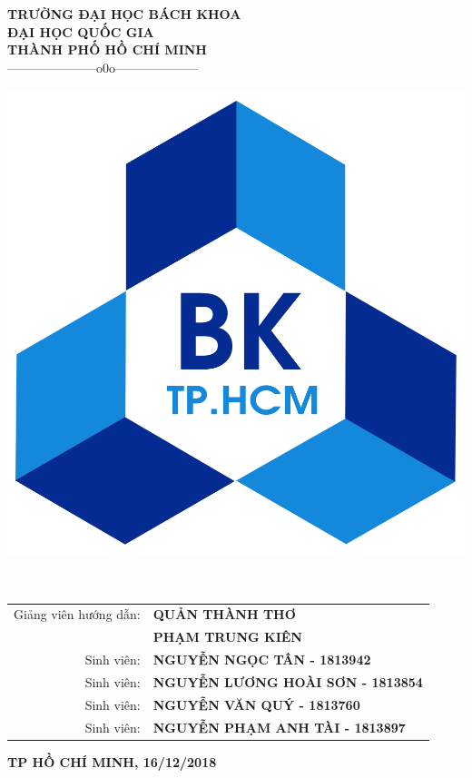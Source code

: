 \documentclass[12pt,a4paper]{report}
\begin{document}
\fontsize{13pt}{18pt}\selectfont %

\setlength{\baselineskip}{18truept}

\begin{titlepage} %

\begin{center}

{\large\bf TRƯỜNG ĐẠI HỌC BÁCH KHOA }\\
{\large\bf ĐẠI HỌC QUỐC GIA }\\
{\large\bf THÀNH PHỐ HỒ CHÍ MINH }\\

{———————o0o——————–}

\vskip 1cm



	\includegraphics[width=0.3\linewidth]{logg}

	\label{fig:logg}


\vskip 1cm

{\Large\bf \textbf{\color{blue}{BÁO CÁO BÀI TẬP LỚN NHẬP MÔN ĐIỆN TOÁN}}}\\

\vskip 1cm

{\bf {\it \color{blue}{Nhóm:}} \color{blue}{NHÓM 1 }} \hspace{0.5cm} {\bf {\it \color{blue}{Lớp:}} \color{blue}{L10}}

\vskip 3cm

\begin{tabular}{r l}

Giảng viên hướng dẫn:&{\bf QUẢN THÀNH THƠ }\\ &{\bf PHẠM TRUNG KIÊN}\\
[0.5cm]

Sinh viên:&{\bf NGUYỄN NGỌC TÂN - 1813942}\\
Sinh viên:&{\bf NGUYỄN LƯƠNG HOÀI SƠN - 1813854}\\
Sinh viên:&{\bf NGUYỄN VĂN QUÝ - 1813760}\\
Sinh viên:&{\bf NGUYỄN PHẠM ANH TÀI - 1813897}\\
[0.5cm]



\end{tabular}

\vfill

{\bf TP HỒ CHÍ MINH, 16/12/2018}

\end{center}

\end{titlepage}
\end{document}
